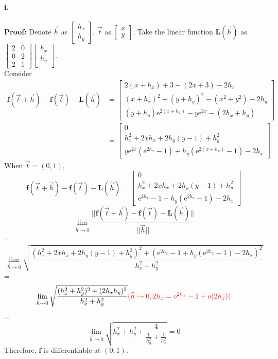 \documentclass[11pt, a4paper]{article}
\begin{document}
\paragraph{i.}
\textbf{Proof:} Denote $\vec{h}$ as $\begin{bmatrix}
    h_x \\
    h_y
\end{bmatrix}$, $\vec{t}$ as
$\begin{bmatrix}
    x \\
    y
\end{bmatrix}$. 
Take the linear function $\bm{L}(\vec{h})$ as $\begin{bmatrix}
    2 & 0 \\
    0 & 2 \\
    2 & 1
\end{bmatrix}
\begin{bmatrix}
    h_x \\
    h_y \\
\end{bmatrix}$. \\ 
Consider
$$\begin{aligned}
    \bm{f}(\vec{t} + \vec{h}) - \bm{f}(\vec{t}) - \bm{L}(\vec{h}) &=
    \begin{bmatrix}
       2(x + h_x) + 3 - (2x + 3) - 2h_x \\
       (x + h_x) ^ 2 + (y + h_y) ^ 2 - (x ^ 2 + y ^ 2) - 2h_y \\
       (y + h_y)\mathrm{e} ^ {2(x + h_x)} - y\mathrm{e} ^ {2x} - (2h_x + h_y)
    \end{bmatrix} \\
    &=
    \begin{bmatrix}
        0 \\
        h_x ^ 2 + 2xh_x + 2h_y(y - 1) + h_y ^ 2 \\
        y\mathrm{e} ^ {2x} (\mathrm{e} ^ {2h_x} - 1) + h_y(\mathrm{e} ^ {2(x + h_x)} - 1) - 2h_x
    \end{bmatrix}
\end{aligned}$$
When $\vec{t} = (0, 1)$,
$$\bm{f}(\vec{t} + \vec{h}) - \bm{f}(\vec{t}) - \bm{L}(\vec{h}) = 
\begin{bmatrix}
    0 \\
    h_x ^ 2 + 2xh_x + 2h_y(y - 1) + h_y ^ 2 \\
    \mathrm{e} ^ {2h_x} - 1 + h_y(\mathrm{e} ^ {2h_x} - 1) - 2h_x
\end{bmatrix}$$
$$\lim_{\vec{h} \to 0} \frac{||\bm{f}(\vec{t} + \vec{h}) - \bm{f}(\vec{t}) - \bm{L}(\vec{h})||}{|| \vec{h} ||}$$
=
$$\lim_{\vec{h} \to 0} \sqrt{\frac{(h_x ^ 2 + 2xh_x + 2h_y(y - 1) + h_y ^ 2) ^ 2 + (\mathrm{e} ^ {2h_x} - 1 + h_y(\mathrm{e} ^ {2h_x} - 1) - 2h_x) ^ 2}{h_x ^ 2 + h_y ^ 2}}$$
=
$$\lim_{\vec{h} \to 0} \sqrt{\frac{(h_x ^ 2 + h_y ^ 2) ^ 2 + (2h_x h_y) ^ 2}{h_x ^ 2 + h_y ^ 2}} {\color{red} (\vec{h} \to 0, 2h_x = \mathrm{e} ^ {2h_x} - 1 + o(2h_x))}$$
=
$$\lim_{\vec{h} \to 0} \sqrt{h_x ^ 2 + h_y ^ 2 + \frac{4}{\frac{1}{h_y ^ 2} + \frac{1}{h_x ^ 2}}} = 0$$
Therefore, $\bm{f}$ is differentiable at $(0, 1)$.
\end{document}
